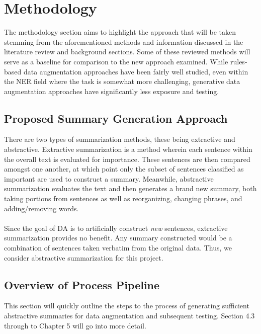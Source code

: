 \documentclass[12pt]{report}
\begin{document}
\chapter{Methodology}
    The methodology section aims to highlight the approach that will be taken stemming from the aforementioned methods and information discussed in the literature review and background sections. Some of these reviewed methods will serve as a baseline for comparison to the new approach examined. While rules-based data augmentation approaches have been fairly well studied, even within the NER field where the task is somewhat more challenging, generative data augmentation approaches have significantly less exposure and testing.
    
    \section{Proposed Summary Generation Approach}
        There are two types of summarization methods, these being extractive and abstractive. Extractive summarization is a method wherein each sentence within the overall text is evaluated for importance. These sentences are then compared amongst one another, at which point only the subset of sentences classified as important are used to construct a summary. Meanwhile, abstractive summarization evaluates the text and then generates a brand new summary, both taking portions from sentences as well as reorganizing, changing phrases, and adding/removing words.
        \\\\
        Since the goal of DA is to artificially construct \textit{new} sentences, extractive summarization provides no benefit. Any summary constructed would be a combination of sentences taken verbatim from the original data. Thus, we consider abstractive summarization for this project.
    \newpage
    \section{Overview of Process Pipeline}
        This section will quickly outline the steps to the process of generating sufficient abstractive summaries for data augmentation and subsequent testing. Section 4.3 through to Chapter 5 will go into more detail.
        
\end{document}

